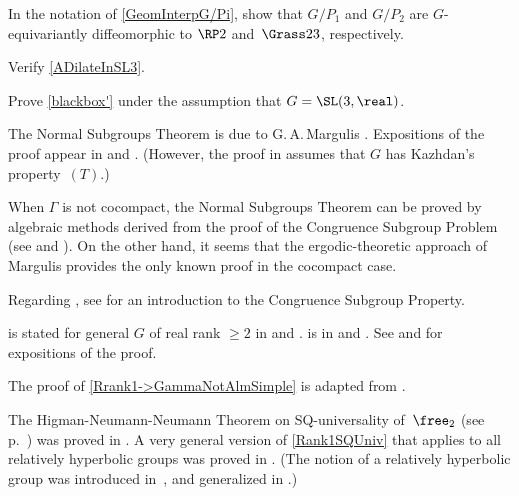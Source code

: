 \begin{exercises}
\item \label{GeomInterpG/PiEx}
In the notation of \cref{GeomInterpG/Pi}, show that $G/P_1$ and $G/P_2$ are $G$-equivariantly diffeomorphic to  $\RP2$ and~$\Grass23$, respectively.

\item \label{ADilateInSL3Ex}
Verify \cref{ADilateInSL3}.

\item \label{BlackBoxSL3PfEx}
Prove \cref{blackbox'} under the assumption that $G = \SL(3,\real)$.
 
 \end{exercises}







\begin{notes}



The Normal Subgroups Theorem  is due to G.\,A.\,Margulis \cite{MargulisFactorGroupsDoklady,MargulisFactorGroups,MargulisFactorGroupsRank1}.
Expositions of the proof appear in \cite[Chap.~4]{MargulisBook} and \cite[Chap.~8]{ZimmerBook}.
(However, the proof in \cite{ZimmerBook} assumes that $G$ has Kazhdan's property~$(T)$.) 

When $\Gamma$ is not cocompact, the Normal Subgroups Theorem can be proved by algebraic methods derived from the proof of the Congruence Subgroup Problem (see \cite[Thms.~A and~B, p.~109]{RaghunathanCSP} and \cite[Cor.~1, p.~75]{RaghunathanCSP2}). 
On the other hand, it seems that the ergodic-theoretic approach of Margulis provides the only known proof in the cocompact case.

Regarding , see 
\cite{Sury-CSPBook} for an introduction to the Congruence Subgroup Property. 

 is stated for general $G$ of real rank $\ge 2$ in \cite[Cor.~2.13]{MargulisBook} and \cite[Thm.~8.1.4]{ZimmerBook}.
 is in \cite[Thm.~4.2.11]{MargulisBook} and \cite[Thm.~8.1.3]{ZimmerBook}. See \cite[\S8.2 and \S8.3]{ZimmerBook} and \cite[\S4.2]{MargulisBook} for expositions of the proof.

The proof of \cref{Rrank1->GammaNotAlmSimple} is adapted from \cite[5.5.F, pp.~150--152]{Gromov-HypGrp}.

The Higman-Neumann-Neumann Theorem on SQ-universality of~$\free_2$ (see p.~\pageref{HNNThm}) was proved in \cite{HNN-F2IsSQUniv}. A very general version of \cref{Rank1SQUniv} that applies to all relatively hyperbolic groups was proved in \cite{HyperIsSQUniv}.
(The notion of a relatively hyperbolic group was introduced in~\cite{Gromov-HypGrp}, and generalized in \cite{Farb-RelHypGrp}.)

\end{notes}


